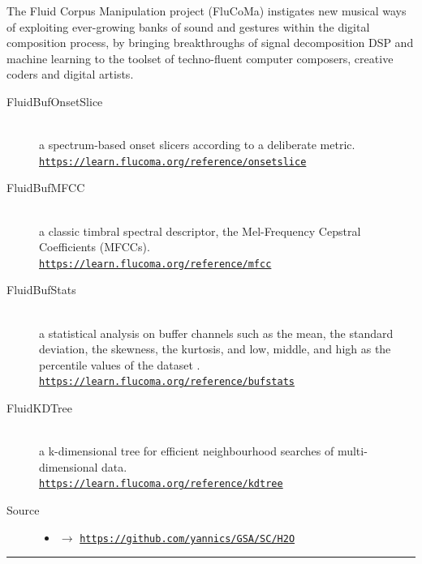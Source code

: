 {The Fluid Corpus Manipulation project (FluCoMa) instigates new musical ways of exploiting ever-growing banks of sound and gestures within the digital composition process, by bringing breakthroughs of signal decomposition DSP and machine learning to the toolset of techno-fluent computer composers, creative coders and digital artists.
\begin{description}
\item[FluidBufOnsetSlice] \hfill \\ a spectrum-based onset slicers according to a deliberate metric.\\ \href{https://learn.flucoma.org/reference/onsetslice}{\texttt{\small https://learn.flucoma.org/reference/onsetslice}}
\item[FluidBufMFCC] \hfill \\ a classic timbral spectral descriptor, the Mel-Frequency Cepstral Coefficients (MFCCs).\\ \href{https://learn.flucoma.org/reference/mfcc}{\texttt{\small https://learn.flucoma.org/reference/mfcc}}
\item[FluidBufStats] \hfill \\ a statistical analysis on buffer channels such as the mean, the standard deviation, the skewness, the kurtosis, and low, middle, and high as the percentile values of the dataset .\\ \href{https://learn.flucoma.org/reference/bufstats}{\texttt{\small https://learn.flucoma.org/reference/bufstats}}
\item[FluidKDTree] \hfill \\ a k-dimensional tree for efficient neighbourhood searches of multi-dimensional data.\\ \href{https://learn.flucoma.org/reference/kdtree}{\texttt{\small https://learn.flucoma.org/reference/kdtree}}
\end{description}} 

\begin{description}
\item[Source] \hfill 
\begin{itemize}
\item[] $\rightarrow$ \href{https://github.com/yannics/GSA/SC/H2O}{\texttt{\small https://github.com/yannics/GSA/SC/H2O}}  
\end{itemize}
\end{description}
\vspace{-4mm}


\begin{center}\rule{0.5\linewidth}{0.5pt}\end{center}

\bigskip


